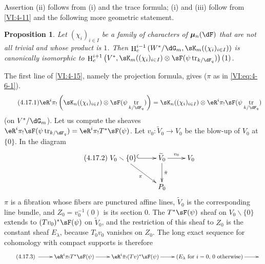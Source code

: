 \documentclass[oneside]{book}
\DeclareMathOperator{\h}{H}
\DeclareMathOperator{\tr}{tr}
\newcommand{\dmu}{{\bm\mu}}
\newcounter{char}
\renewcommand{\setminus}{\smallsetminus}
\theoremstyle{sga-source}
\theoremstyle{sga-source-dash}
\theoremstyle{sga-source-dotdash}
\theoremstyle{sga-source-number-note-dash}
\theoremstyle{sga-source-note-number-dotdash}
\theoremstyle{sga-source-example-dotdash}
\theoremstyle{sga-source-inline-number}
\theoremstyle{sga-source-bare-number}
\theoremstyle{sga-source}
\newtheorem{proposition_}[subsection]{Proposition}
\newcommand{\PrintPage}[1]{}\newcommand{\MathPage}[1]{}\newcommand{\PrintCite}[2]{#1}\newcommand{\var}[3]{#1}
\begin{document}
\PrintPage{205}
Assertion (ii) follows from (i) and the trace formula; (i) and (iii) 
follow from \ref{VI:4-11} and the following more geometric statement. 





\begin{proposition_}\label{VI:4-17}
Let $(\chi_i)_{i\in I}$ be a family of characters of 
$\dmu_n(\dF)$ that are not all trivial and whose product is $1$. Then 
$\h_c^{i-1}\left(W^\ast/\dG_m,\var{\sK_m((\chi_i)_{i\in I})}{\sK_n((\chi_i)_{i\in I})}{S45-SOL-0847}\right)$ is 
canonically isomorphic to 
\newline
$\h_c^{i+1}\left(V^\ast,\var{\sK_m((\chi_i)_{i\in I})}{\sK_n((\chi_i)_{i\in I})}{S45-SOL-0847}\otimes \sF(\psi\tr_{k/\dF_q})\right)(1)$. 
\end{proposition_}

The first line of \ref{VI:4-15}, namely the projection formula, gives ($\pi$ as in 
\eqref{VI:eq:4-6-1}). 
\begin{equation*}\tag{4.17.1}\label{VI:eq:4-17-1}
  \eR^i \pi_!\left(\sK_n((\chi_i)_{i\in I})\otimes \sF(\psi \tr_{k/\dF_q})\right) = \sK_n((\chi_i)_{i\in I}) \otimes \eR^i \pi_! \sF(\psi\tr_{k/\dF_q}) 
\end{equation*}
(on $V^\ast/\dG_m$). Let us compute the sheaves 
$\eR^i\pi_! \sF(\psi\tr_{k/\dF_q}) = \eR^i \pi_! T^\ast \sF(\psi)$. Let 
$v_0:\widetilde V_0 \to V_0$ be the blow-up of $V_0$ at $\{0\}$. In the 
diagram 
\begin{equation*}\tag{4.17.2}\label{VI:eq:4-17-2}
\xymatrix{
  V_0\setminus \{0\} \ar@{^{(}->}[r] \ar[dr]_-\pi 
    & \widetilde V_0 \ar[r]^-{v_0} \ar[d]^-{\bar\pi} 
    & V_0 \\
  & P_0 
}
\end{equation*}
$\pi$ is a fibration whose fibers are punctured affine lines, $\widetilde V_0$ 
is the corresponding line bundle, and $Z_0=v_0^{-1}(0)$ is its section $0$. 
The $T^\ast\sF(\psi)$ sheaf on $V_0\setminus \{0\}$ extends to 
$(T v_0)^\ast \sF(\psi)$ on $\widetilde V_0$, and the restriction of this sheaf 
to $Z_0$ is the constant sheaf $E_\lambda$, because $T_0 v_0$ vanishes on 
$Z_0$. The long exact sequence for cohomology with compact supports is therefore 
\begin{equation*}\tag{4.17.3}\label{VI:eq:4-17-3}
\xymatrix{
  \ar[r] 
    & \eR^i \pi_! T^\ast \sF(\psi) \ar[r] 
    & \eR^i \bar\pi_! (T v)^\ast \sF(\psi) \ar[r] 
    & (E_\lambda\text{ for $i=0$, $0$ otherwise}) \ar[r] 
    & 
}
\end{equation*}
\end{document}
